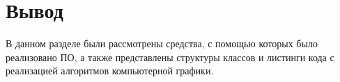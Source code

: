 %
%
%
%
%
%
\section*{Вывод}

В данном разделе были рассмотрены средства, с помощью которых было реализовано ПО, а также представлены структуры классов и листинги кода с реализацией алгоритмов компьютерной графики.
